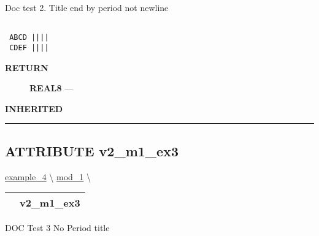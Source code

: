 Doc test 2. Title end by period not newline 
\begin{verbatim}

 ABCD ||||
 CDEF ||||\end{verbatim}










\par
\begin{description}
\item [\colorbox{tagtype}{\color{white} \textbf{\textsf{RETURN}}}] \textbf{REAL8} --- 
\end{description}






\par
\begin{description}
\item [\colorbox{tagtype}{\color{white} \textbf{\textsf{INHERITED}}}] 
\end{description}



\rule{\linewidth}{0.5pt}
\subsection*{\textsf{\colorbox{headtoc}{\color{white} ATTRIBUTE}
v2\_m1\_ex3}}

\hypertarget{ecldoc:example_3.mod_1.v2_m1_ex3}{}
\hspace{0pt} \hyperlink{ecldoc:intest.inintest.example_4}{example_4} \textbackslash 
\hspace{0pt} \hyperlink{ecldoc:intest.inintest.example_4.mod_1}{mod_1} \textbackslash 

{\renewcommand{\arraystretch}{1.5}
\begin{tabularx}{\textwidth}{|>{\raggedright\arraybackslash}l|X|}
\hline
\hspace{0pt}\mytexttt{\color{red} } & \textbf{v2\_m1\_ex3} \\
\hline
\end{tabularx}
}

\par





DOC Test 3 No Period title








